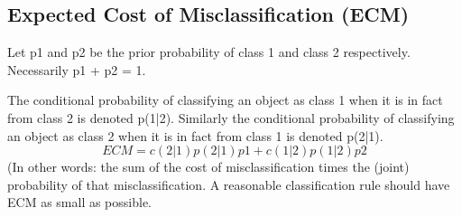\documentclass[]{report}
\begin{document}
\subsection*{ Expected Cost of Misclassification (ECM)}
Let p1 and p2 be the prior probability of class 1 and class 2 respectively.
Necessarily p1 + p2 = 1.

The conditional probability of classifying an object as class 1 when it is
in fact from class 2 is denoted p(1|2). Similarly the conditional probability
of classifying an object as class 2 when it is in fact from class 1 is denoted
p(2|1).
\[ ECM = c(2|1)p(2|1)p1 + c(1|2)p(1|2)p2\]
(In other words: the sum of the cost of misclassification times the (joint)
probability of that misclassification.
A reasonable classification rule should have ECM as small as possible.
\end{document}
